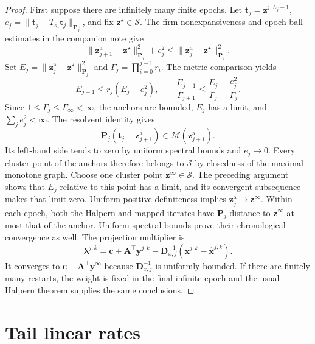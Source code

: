 \documentclass[11pt]{article}
\newcommand{\np}[2]{\lVert#1\rVert_{#2}}
\begin{document}
\begin{proof}
First suppose there are infinitely many finite epochs.
Let $\mathbf t_j=\mathbf z^{j,L_j-1}$, $e_j=\np{\mathbf t_j-T_{s_j}\mathbf t_j}{\mathbf P_j}$, and fix $\mathbf z^\star\in\mathcal S$.
The firm nonexpansiveness and epoch-ball estimates in the companion note give
\begin{equation}
\np{\mathbf z_{j+1}^{\mathrm a}-\mathbf z^\star}{\mathbf P_j}^{2}+e_j^2\leq\np{\mathbf z_j^{\mathrm a}-\mathbf z^\star}{\mathbf P_j}^{2}.
\end{equation}
Set $E_j=\np{\mathbf z_j^{\mathrm a}-\mathbf z^\star}{\mathbf P_j}^{2}$ and $\Gamma_j=\prod_{i=0}^{j-1}r_i$.
The metric comparison yields
\begin{equation}
E_{j+1}\leq r_j(E_j-e_j^2),\qquad \frac{E_{j+1}}{\Gamma_{j+1}}\leq\frac{E_j}{\Gamma_j}-\frac{e_j^2}{\Gamma_j}.
\label{eq:scaled}
\end{equation}
Since $1\leq\Gamma_j\leq\Gamma_\infty<\infty$, the anchors are bounded, $E_j$ has a limit, and $\sum_je_j^2<\infty$.
The resolvent identity gives
\begin{equation}
\mathbf P_j(\mathbf t_j-\mathbf z_{j+1}^{\mathrm a})\in\mathcal M(\mathbf z_{j+1}^{\mathrm a}).
\end{equation}
Its left-hand side tends to zero by uniform spectral bounds and $e_j\to0$.
Every cluster point of the anchors therefore belongs to $\mathcal S$ by closedness of the maximal monotone graph.
Choose one cluster point $\mathbf z^\infty\in\mathcal S$.
The preceding argument shows that $E_j$ relative to this point has a limit, and its convergent subsequence makes that limit zero.
Uniform positive definiteness implies $\mathbf z_j^{\mathrm a}\to\mathbf z^\infty$.
Within each epoch, both the Halpern and mapped iterates have $\mathbf P_j$-distance to $\mathbf z^\infty$ at most that of the anchor.
Uniform spectral bounds prove their chronological convergence as well.
The projection multiplier is
\begin{equation}
\boldsymbol\lambda^{j,k}=\mathbf c+\mathbf A^\top\mathbf y^{j,k}-\mathbf D_{x,j}^{-1}(\mathbf x^{j,k}-\widehat{\mathbf x}^{j,k}).
\end{equation}
It converges to $\mathbf c+\mathbf A^\top\mathbf y^\infty$ because $\mathbf D_{x,j}^{-1}$ is uniformly bounded.
If there are finitely many restarts, the weight is fixed in the final infinite epoch and the usual Halpern theorem supplies the same conclusions.
\end{proof}

\section{Tail linear rates}
\end{document}
